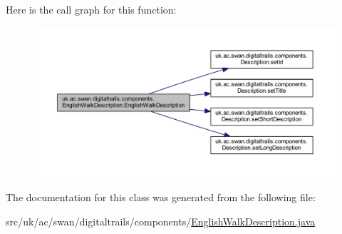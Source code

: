 Here is the call graph for this function\+:\nopagebreak
\begin{figure}[H]
\begin{center}
\leavevmode
\includegraphics[width=350pt]{classuk_1_1ac_1_1swan_1_1digitaltrails_1_1components_1_1_english_walk_description_a1ddd86a84daf7bf1294d8cdd0eafa138_cgraph}
\end{center}
\end{figure}




The documentation for this class was generated from the following file\+:\begin{DoxyCompactItemize}
\item 
src/uk/ac/swan/digitaltrails/components/\hyperlink{_english_walk_description_8java}{English\+Walk\+Description.\+java}\end{DoxyCompactItemize}
